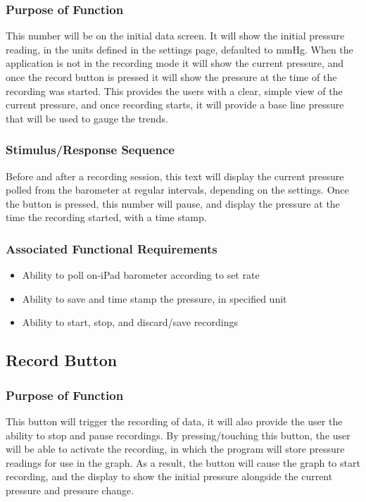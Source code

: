 \documentclass[onecolumn, draftclsnofoot,10pt, compsoc]{IEEEtran}
\begin{document}
\subsubsection{Purpose of Function}
This number will be on the initial data screen.
It will show the initial pressure reading, in the units defined in the settings page, defaulted to mmHg.
When the application is not in the recording mode it will show the current pressure, and once the record button is pressed it will show the pressure at the time of the recording was started.
This provides the users with a clear, simple view of the current pressure, and once recording starts, it will provide a base line pressure that will be used to gauge the trends.
\subsubsection{Stimulus/Response Sequence}
Before and after a recording session, this text will display the current pressure polled from the barometer at regular intervals, depending on the settings.
Once the button is pressed, this number will pause, and display the pressure at the time the recording started, with a time stamp.

\subsubsection{Associated Functional Requirements}
\begin{itemize}
\item Ability to poll on-iPad barometer according to set rate
\item Ability to save and time stamp the pressure, in specified unit
\item Ability to start, stop, and discard/save recordings
\end{itemize}

\subsection{Record Button}

\subsubsection{Purpose of Function}
This button will trigger the recording of data, it will also provide the user the ability to stop and pause recordings.
By pressing/touching this button, the user will be able to activate the recording, in which the program will store pressure readings for use in the graph.
As a result, the button will cause the graph to start recording, and the display to show the initial pressure alongside the current pressure and pressure change.
\end{document}

